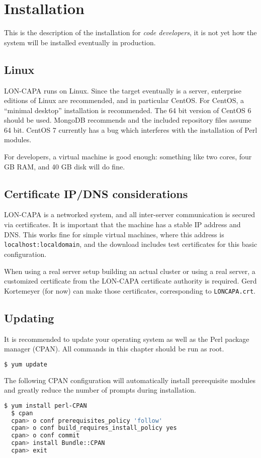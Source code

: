 \chapter{Installation}
This is the description of the installation for {\it code developers}, it is not yet how the system will be installed eventually in production.

\section{Linux}
LON-CAPA runs on Linux. Since the target eventually is a server, enterprise editions of Linux are recommended, and in particular CentOS. For CentOS, a ``minimal desktop'' installation is recommended.  The 64 bit version of CentOS 6 should be used.  MongoDB recommends and the included repository files assume 64 bit.  CentOS 7 currently has a bug which interferes with the installation of Perl modules.

For developers, a virtual machine is good enough: something like two cores, four GB RAM, and 40 GB disk will do fine.

\section{Certificate IP/DNS considerations}
LON-CAPA is a networked system, and all inter-server communication is secured via certificates. It is important that the machine has a stable IP address and DNS. This works fine for simple virtual machines, where this address is {\tt localhost:localdomain}, and the download includes test certificates for this basic configuration.

When using a real server setup building an actual cluster or using a real server, a customized certificate from the LON-CAPA certificate authority is required. Gerd Kortemeyer (for now) can make those certificates, corresponding to {\tt LONCAPA.crt}.

\section{Updating}
It is recommended to update your operating system as well as the Perl package manager (CPAN).  All commands in this chapter should be run as root.
\begin{lstlisting}[language=bash]
  $ yum update
\end{lstlisting}
The following CPAN configuration will automatically install prerequisite modules and greatly reduce the number of prompts during installation.
\begin{lstlisting}[language=bash]
  $ yum install perl-CPAN
  $ cpan
  cpan> o conf prerequisites_policy 'follow' 
  cpan> o conf build_requires_install_policy yes 
  cpan> o conf commit
  cpan> install Bundle::CPAN
  cpan> exit
\end{lstlisting}

